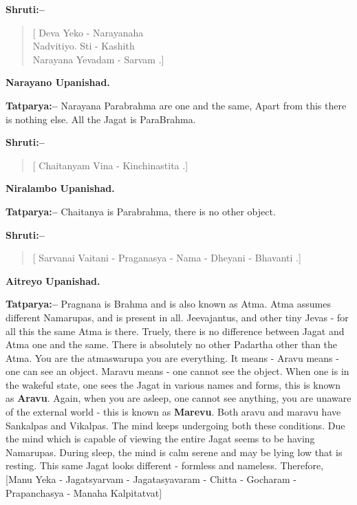\textbf{Shruti:–}

\begin{verse}
[ Deva Yeko - Narayanaha \\ Nadvitiyo. Sti - Kashith \\ Narayana Yevadam - Sarvam .]
\end{verse}

\begin{flushright}
\textbf{Narayano Upanishad.}
\end{flushright}

\textbf{Tatparya:–} Narayana Parabrahma are one and the same, Apart from this there is nothing else. All the Jagat is ParaBrahma.

\textbf{Shruti:–}

\begin{verse}
[ Chaitanyam Vina - Kinchinastita .]
\end{verse}

\begin{flushright}
\textbf{Niralambo Upanishad.}
\end{flushright}

\textbf{Tatparya:–} Chaitanya is Parabrahma, there is no other object.

\textbf{Shruti:–}

\begin{verse}
[ Sarvanai Vaitani - Praganasya - Nama - Dheyani - Bhavanti .]
\end{verse}

\begin{flushright}
\textbf{Aitreyo Upanishad.}
\end{flushright}

\textbf{Tatparya:–} Pragnana is Brahma and is also known as Atma. Atma assumes different Namarupas, and is present in all. Jeevajantus, and other tiny Jevas - for all this the same Atma is there. Truely, there is no difference between Jagat and Atma one and the same. There is absolutely no other Padartha other than the Atma. You are the atmaswarupa you are everything. It means - Aravu means - one can see an object. Maravu means - one cannot see the object. When one is in the wakeful state, one sees the Jagat in various names and forms, this is known as \textbf{Aravu}. Again, when you are asleep, one cannot see anything, you are unaware of the external world - this is known as \textbf{Marevu}. Both aravu and maravu have Sankalpas and Vikalpas. The mind keeps undergoing both these conditions. Due the mind which is capable of viewing the entire Jagat seems to be having Namarupas. During sleep, the mind is calm serene and may be lying low that is resting. This same Jagat looks different - formless and nameless. Therefore, [Manu Yeka - Jagatsyarvam - Jagatasyavaram - Chitta - Gocharam - Prapanchasya - Manaha Kalpitatvat]

